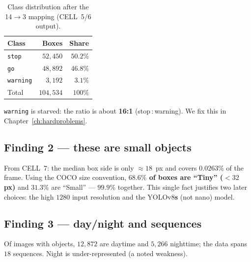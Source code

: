 \begin{table}[H]\centering
\caption{Class distribution after the 14$\to$3 mapping (CELL~5/6 output).}
\label{tab:classdist}
\begin{tabular}{lrr}
\toprule
Class & Boxes & Share \\
\midrule
\texttt{stop}    & $52{,}450$ & $50.2\%$ \\
\texttt{go}      & $48{,}892$ & $46.8\%$ \\
\texttt{warning} & $3{,}192$  & $3.1\%$  \\
\midrule
Total & $104{,}534$ & $100\%$ \\
\bottomrule
\end{tabular}
\end{table}

\noindent
\texttt{warning} is starved: the ratio is about
\textbf{16:1} (stop\,:\,warning). We fix this in
Chapter~\ref{ch:hardproblems}.


\subsection{Finding 2 --- these are small objects}
From CELL~7: the median box side is only $\approx 18$~px and covers
$0.0263\%$ of the frame. Using the COCO size convention,
\textbf{$68.6\%$ of boxes are ``Tiny'' ($<32$\,px)} and $31.3\%$ are
``Small'' --- $99.9\%$ together. This single fact justifies two later
choices: the high $1280$ input resolution and the YOLOv8\textbf{s} (not
nano) model.


\subsection{Finding 3 --- day/night and sequences}
Of images with objects, $12{,}872$ are daytime and $5{,}266$ nighttime;
the data spans $18$ sequences. Night is under-represented (a noted
weakness).


